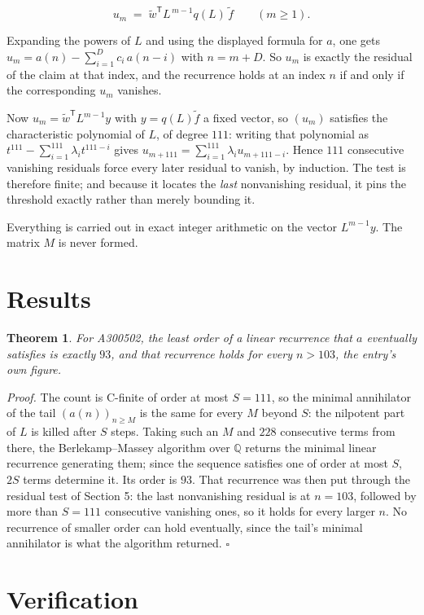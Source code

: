\documentclass[11pt]{article}
\newtheorem{theorem}{Theorem}
\theoremstyle{definition}
\begin{document}
\[u_m \;=\; \tilde w^{\mathsf T} L^{\,m-1} q(L)\,\tilde f \qquad (m \ge 1).\]

Expanding the powers of $L$ and using the displayed formula for $a$, one gets $u_m = a(n) - \sum_{i=1}^{D} c_i\,a(n-i)$ with $n = m + D$. So $u_m$ is exactly the residual of the claim at that index, and the recurrence holds at an index $n$ if and only if the corresponding $u_m$ vanishes.

Now $u_m = \tilde w^{\mathsf T} L^{m-1} y$ with $y = q(L)\tilde f$ a fixed vector, so $(u_m)$ satisfies the characteristic polynomial of $L$, of degree $111$: writing that polynomial as $t^{111} - \sum_{i=1}^{111} \lambda_i t^{111-i}$ gives $u_{m+111} = \sum_{i=1}^{111} \lambda_i u_{m+111-i}$. Hence $111$ consecutive vanishing residuals force every later residual to vanish, by induction. The test is therefore finite; and because it locates the {\itshape last} nonvanishing residual, it pins the threshold exactly rather than merely bounding it.

Everything is carried out in exact integer arithmetic on the vector $L^{m-1}y$. The matrix $M$ is never formed.

\section{Results}

\begin{theorem} For A300502, the least order of a linear recurrence that $a$ eventually satisfies is exactly $93$, and that recurrence holds for every $n > 103$, the entry's own figure.\end{theorem}

{\itshape Proof.} The count is C-finite of order at most $S = 111$, so the minimal annihilator of the tail $(a(n))_{n \ge M}$ is the same for every $M$ beyond $S$: the nilpotent part of $L$ is killed after $S$ steps. Taking such an $M$ and $228$ consecutive terms from there, the Berlekamp--Massey algorithm over $\mathbb{Q}$ returns the minimal linear recurrence generating them; since the sequence satisfies one of order at most $S$, $2S$ terms determine it. Its order is $93$. That recurrence was then put through the residual test of Section 5: the last nonvanishing residual is at $n = 103$, followed by more than $S = 111$ consecutive vanishing ones, so it holds for every larger $n$. No recurrence of smaller order can hold eventually, since the tail's minimal annihilator is what the algorithm returned. $\square$

\section{Verification}
\end{document}
